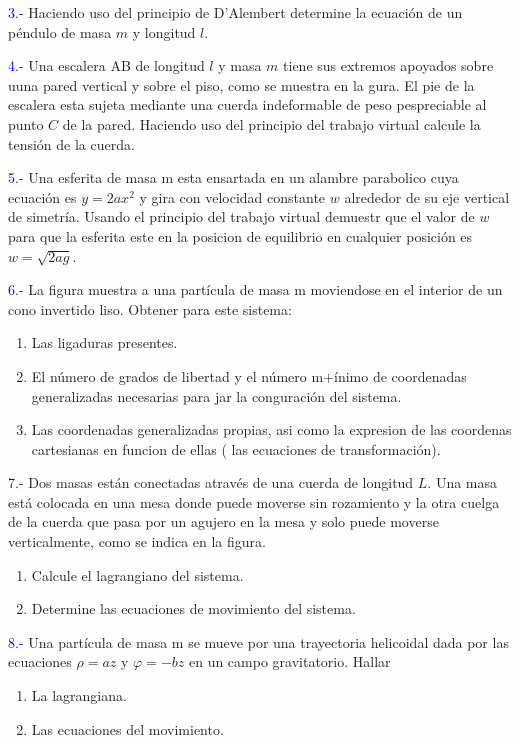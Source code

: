 \documentclass[../main]{subfiles}
\begin{document}
\textcolor{blue}{3.-} Haciendo uso del principio de D'Alembert determine la ecuación de un péndulo de masa $m$ y longitud $l$.

\textcolor{blue}{4.-} Una escalera AB de longitud $l$ y masa $m$ tiene sus extremos apoyados sobre uuna pared vertical y sobre el piso, como se muestra en la gura. El pie de la escalera esta sujeta mediante una cuerda indeformable de peso pespreciable al punto $C$ de la pared. Haciendo uso del principio del trabajo virtual calcule la tensión de la cuerda.

\textcolor{blue}{5.-} Una esferita de masa m esta ensartada en un alambre parabolico cuya ecuación es $y=2ax^2$ y gira con velocidad constante $w$ alrededor de su eje vertical de simetría. Usando el principio del trabajo virtual demuestr que el valor de $w$ para que la esferita este en la posicion de equilibrio en cualquier posición es $w=\sqrt{2ag}$.

\textcolor{blue}{6.-} La figura muestra a una partícula de masa m moviendose en el interior de un cono invertido liso. Obtener para este sistema:
\begin{enumerate}[label=(\alph*)]
    \item Las ligaduras presentes.
    \item El número de grados de libertad y el número m+ínimo de coordenadas generalizadas necesarias para jar la conguración del sistema.
    \item Las coordenadas generalizadas propias, asi como la expresion de las coordenas cartesianas en funcion de ellas ( las ecuaciones de transformación).
\end{enumerate}

\textcolor{blue}{7.-} Dos masas están conectadas através de una cuerda de longitud $L$. Una masa está colocada en una mesa donde puede moverse sin rozamiento y la otra cuelga de la cuerda que pasa por un agujero en la mesa y solo puede moverse verticalmente, como se indica en la figura.
\begin{enumerate}[label=(\alph*)]
    \item Calcule el lagrangiano del sistema.
    \item Determine las ecuaciones de movimiento del sistema.
\end{enumerate}

\textcolor{blue}{8.-} Una partícula de masa m se mueve por una trayectoria helicoidal dada por las ecuaciones $\rho=az$ y $\varphi=-bz$ en un campo gravitatorio. Hallar
\begin{enumerate}[label=(\alph*)]
    \item La lagrangiana.
    \item Las ecuaciones del movimiento.
\end{enumerate}
\end{document}
